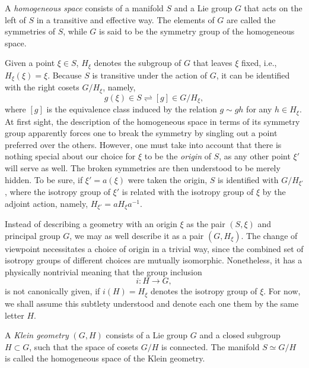 \documentclass[
final,
11pt,
a4paper,
DIV=11,
headinclude=true,
footinclude=false,
bibliography=totoc,
twoside=true,  %
BCOR=5mm
]{scrbook}
\begin{document}
\begin{definition}
A \emph{homogeneous space} consists of a manifold $S$ and a Lie 
group $G$ that acts on the left of $S$ in a transitive and 
effective way. The elements of $G$ are called the symmetries of 
$S$, while $G$ is said to be the symmetry group of the 
homogeneous space.
\end{definition}

Given a point $\xi \in S$, $H_\xi$ denotes the subgroup of $G$ 
that leaves $\xi$ fixed, i.e., $H_\xi(\xi) = \xi$. Because $S$ is 
transitive under the action of $G$, it can be identified with the 
right cosets $G/H_\xi$, namely,
\begin{equation*}
  g(\xi) \in S \rightleftharpoons
  [g] \in G/H_\xi,
\end{equation*}
where $[g]$ is the equivalence class induced by the relation $g 
\sim gh$ for any $h \in H_\xi$. At first sight, the description 
of the homogeneous space in terms of its symmetry group 
apparently forces one to break the symmetry by singling out a 
point preferred over the others. However, one must take into 
account that there is nothing special about our choice for $\xi$ 
to be the \emph{origin} of $S$, as any other point $\xi'$ will 
serve as well. The broken symmetries are then understood to be 
merely hidden. To be sure, if $\xi' = a(\xi)$ were taken the 
origin, $S$ is identified with $G/H_{\xi'}$, where the isotropy 
group of $\xi'$ is related with the isotropy group of $\xi$ by 
the adjoint action, namely, $H_{\xi'} = a H_\xi a^{-1}$.

Instead of describing a geometry with an origin $\xi$ as the pair 
$(S,\xi)$ and principal group $G$, we may as well describe it as 
a pair $(G,H_\xi)$. The change of viewpoint necessitates a choice 
of origin in a trivial way, since the combined set of isotropy 
groups of different choices are mutually isomorphic.  
Nonetheless, it has a physically nontrivial meaning that the 
group inclusion
\begin{equation*}
  i : H \to G,
\end{equation*}
is not canonically given, if $i(H) = H_\xi$ denotes the isotropy 
group of $\xi$. For now, we shall assume this subtlety understood 
and denote each one them by the same letter $H$. 

\begin{definition}
A \emph{Klein geometry} $(G,H)$ consists of a Lie group $G$ and a 
closed subgroup $H \subset G$, such that the space of cosets 
$G/H$ is connected. The manifold $S \simeq G/H$ is called the 
homogeneous space of the Klein geometry.
\end{definition}
\end{document}
